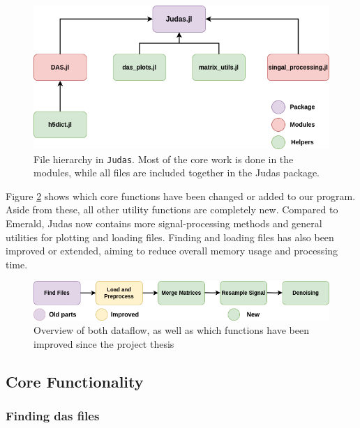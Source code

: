 \begin{figure}[!h]
    \centering
    \includegraphics[scale=.5]{figures/judas_overview.png}
    \caption{File hierarchy in \texttt{Judas}. Most of the core work is done in the modules, while all files are included together in the Judas package.}
    \label{fig:judasoverview}
\end{figure}

Figure \ref{fig:apiflow} shows which core functions have been changed or added to our program. Aside from these, all other utility functions are completely new. Compared to Emerald, Judas now contains more signal-processing methods and general utilities for plotting and loading files. Finding and loading files has also been improved or extended, aiming to reduce overall memory usage and processing time. \\
\begin{figure}[!h]
    \centering
    \includegraphics[scale=0.5]{figures/dataflow.png}
    \caption{Overview of both dataflow, as well as which functions have been improved since the project thesis \cite{projthesis}}
    \label{fig:apiflow}
\end{figure}
\subsection{Core Functionality}

\subsubsection{Finding \acrshort{das} files}
\label{met:finddasfiles}

